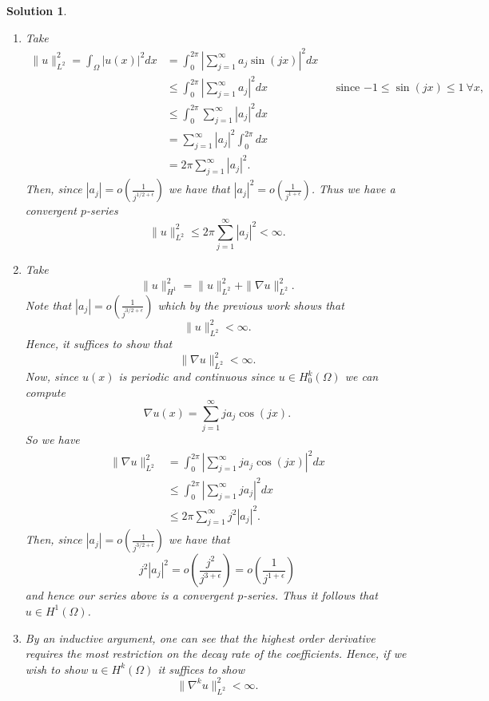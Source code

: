 \documentclass[leqno]{article}
\theoremstyle{nonumberplain}
\newtheorem{solution}{Solution}
\begin{document}
\begin{solution}~
\begin{enumerate}
    \item Take
    \begin{align*}
        \|u\|_{L^2}^2=\int_\Omega |u(x)|^2dx &= \int_0^{2\pi} \left| \sum_{j=1}^\infty a_j \sin(jx)\right|^2 dx\\
        &\leq \int_0^{2\pi} \left| \sum_{j=1}^\infty a_j\right|^2dx &&\textrm{since $-1\leq \sin(jx)\leq 1~\forall x$},\\
        &\leq \int_0^{2\pi} \sum_{j=1}^\infty |a_j|^2 dx\\
        &=\sum_{j=1}^\infty |a_j|^2 \int_0^{2\pi} dx\\
        &=2\pi \sum_{j=1}^\infty |a_j|^2.
    \end{align*}
    Then, since $|a_j|=o\left(\frac{1}{j^{1/2+\epsilon}}\right)$ we have that $|a_j|^2=o\left(\frac{1}{j^{1+\epsilon}}\right)$.  Thus we have a convergent $p$-series
    \[
    \|u\|_{L^2}^2 \leq 2\pi \sum_{j=1}^\infty |a_j|^2 < \infty.
    \]
    \item Take
    \[
    \|u\|_{H^1}^2 = \|u\|_{L^2}^2+\|\nabla u\|_{L^2}^2.
    \]
    Note that $|a_j|=o\left(\frac{1}{j^{3/2+\epsilon}}\right)$ which by the previous work shows that
    \[
    \|u\|_{L^2}^2<\infty.
    \]
    Hence, it suffices to show that
    \[
    \|\nabla u\|_{L^2}^2<\infty.
    \]
    Now, since $u(x)$ is periodic and continuous since $u\in H_0^k(\Omega)$ we can compute
    \[
    \nabla u(x) = \sum_{j=1}^\infty ja_j\cos(jx).
    \]
    So we have
    \begin{align*}
        \|\nabla u\|_{L^2}^2 &= \int_0^{2\pi} \left| \sum_{j=1}^\infty ja_j \cos(jx)\right|^2dx\\
        &\leq \int_0^{2\pi} \left|\sum_{j=1}^\infty ja_j\right|^2dx\\
        &\leq 2\pi \sum_{j=1}^\infty j^2|a_j|^2.
    \end{align*}
    Then, since $|a_j|=o\left(\frac{1}{j^{3/2+\epsilon}}\right)$ we have that
    \[
    j^2|a_j|^2 = o\left( \frac{j^2}{j^{3+\epsilon}}\right)=o\left(\frac{1}{j^{1+\epsilon}}\right)
    \]
    and hence our series above is a convergent $p$-series.  Thus it follows that $u\in H^1(\Omega)$.
    \item By an inductive argument, one can see that the highest order derivative requires the most restriction on the decay rate of the coefficients.  Hence, if we wish to show $u\in H^k(\Omega)$ it suffices to show
    \[
    \|\nabla^k u\|_{L^2}^2<\infty.
\]
\end{enumerate}
\end{solution}
\end{document}
